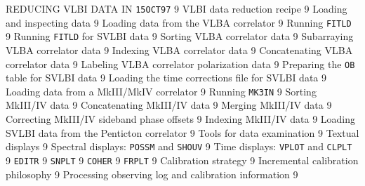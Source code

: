      {REDUCING VLBI DATA IN \AIPS%
}                    {{\tt 15OCT97}\hskip 0.6cm 9}
   {VLBI data reduction recipe}                  {9}
   {Loading and inspecting data}                 {9}
 {Loading data from the VLBA correlator}       {9}
 {Running {\tt FITLD}}                       {9}
 {Running {\tt FITLD} for SVLBI data}        {9}
 {Sorting VLBA correlator data}              {9}
 {Subarraying VLBA correlator data}          {9}
 {Indexing VLBA correlator data}             {9}
 {Concatenating VLBA correlator data}        {9}
 {Labeling VLBA correlator polarization data} {9}
 {Preparing the {\tt OB} table for SVLBI
                     data}                                    {9}
 {Loading the time corrections file for
                     SVLBI data}                              {9}
 {Loading data from a MkIII/MkIV correlator}   {9}
 {Running {\tt MK3IN}}                      {9}
 {Sorting MkIII/IV data}                    {9}
 {Concatenating MkIII/IV data}              {9}
 {Merging MkIII/IV data}                    {9}
 {Correcting MkIII/IV sideband phase
                     offsets}                                 {9}
 {Indexing MkIII/IV data}                   {9}
 {Loading SVLBI data from the Penticton
                     correlator}                              {9}
   {Tools for data examination}                  {9}
 {Textual displays}                            {9}
 {Spectral displays: {\tt POSSM} and
                     {\tt SHOUV}}                             {9}
 {Time displays: {\tt VPLOT} and
                     {\tt CLPLT}}                             {9}
 {{\tt EDITR}}                                 {9}
 {{\tt SNPLT}}                                 {9}
 {{\tt COHER}}                                 {9}
 {{\tt FRPLT}}                                 {9}
   {Calibration strategy}                        {9}
 {Incremental calibration philosophy}          {9}
 {Processing observing log and calibration
                      information}                            {9}
